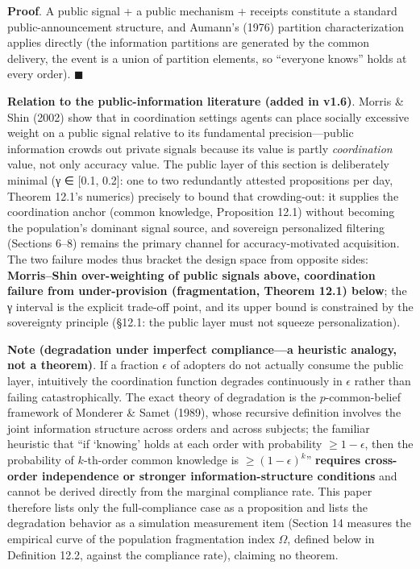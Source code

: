 \documentclass[
  11pt]{article}
\begin{document}
\textbf{Proof}. A public signal + a public mechanism + receipts
constitute a standard public-announcement structure, and Aumann's (1976)
partition characterization applies directly (the information partitions
are generated by the common delivery, the event is a union of partition
elements, so ``everyone knows'' holds at every order). \(\blacksquare\)

\textbf{Relation to the public-information literature (added in v1.6)}.
Morris \& Shin (2002) show that in coordination settings agents can
place socially excessive weight on a public signal relative to its
fundamental precision---public information crowds out private signals
because its value is partly \emph{coordination} value, not only accuracy
value. The public layer of this section is deliberately minimal (γ ∈
{[}0.1, 0.2{]}: one to two redundantly attested propositions per day,
Theorem 12.1's numerics) precisely to bound that crowding-out: it
supplies the coordination anchor (common knowledge, Proposition 12.1)
without becoming the population's dominant signal source, and sovereign
personalized filtering (Sections 6--8) remains the primary channel for
accuracy-motivated acquisition. The two failure modes thus bracket the
design space from opposite sides: \textbf{Morris--Shin over-weighting of
public signals above, coordination failure from under-provision
(fragmentation, Theorem 12.1) below}; the γ interval is the explicit
trade-off point, and its upper bound is constrained by the sovereignty
principle (§12.1: the public layer must not squeeze personalization).

\textbf{Note (degradation under imperfect compliance---a heuristic
analogy, not a theorem)}. If a fraction \(\epsilon\) of adopters do not
actually consume the public layer, intuitively the coordination function
degrades continuously in \(\epsilon\) rather than failing
catastrophically. The exact theory of degradation is the
\(p\)-common-belief framework of Monderer \& Samet (1989), whose
recursive definition involves the joint information structure across
orders and across subjects; the familiar heuristic that ``if `knowing'
holds at each order with probability \(\ge 1-\epsilon\), then the
probability of \(k\)-th-order common knowledge is
\(\ge (1-\epsilon)^k\)'' \textbf{requires cross-order independence or
stronger information-structure conditions} and cannot be derived
directly from the marginal compliance rate. This paper therefore lists
only the full-compliance case as a proposition and lists the degradation
behavior as a simulation measurement item (Section 14 measures the
empirical curve of the population fragmentation index \(\Omega\),
defined below in Definition 12.2, against the compliance rate), claiming
no theorem.
\end{document}
